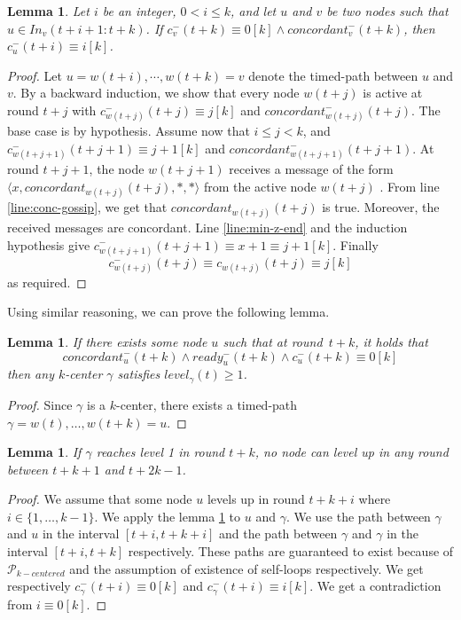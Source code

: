 \documentclass[11pt,letterpaper]{article}
\newtheorem{lem}[thm]{Lemma}
\newcommand{\cent}{\gamma}
\begin{document}
\begin{lem} \label{lem:conc-safety}
Let $i$ be an integer, $0 < i \leq k$, and let  $u$ and $v$ be two nodes such that  $u\in In_v( t+i +1 : t+k)$.
If $c^{-}_v(t+k) \equiv 0 [k] \wedge concordant^{-}_v(t+k)$, then $c_u^{-}(t+i) \equiv i [k]$.
\end{lem}
\begin{proof}
Let $u = w(t+i), \cdots, w(t+k) = v$ denote the timed-path between $u$ and $v$.
By  a backward induction,  we show  that every node $w(t+j)$  is active at round $ t + j $
	with $c_{w(t+j)}^{-}(t+j) \equiv j [k]$ and $concordant_{w(t+j)}^{-}(t+j)$.
The base case is by hypothesis.
Assume now that $i \leq j < k$, and $c_{w(t+j+1)}^{-}(t+j+1) \equiv j+1 [k]$ and $concordant_{w(t+j+1)}^{-}(t+j+1)$.
At round $t+j+1$,  the node $w(t+j+1)$ receives a message of the form $\langle x, concordant_{w(t+j)}(t+j), *, * \rangle$ %
	from the active node $w(t+j)$ .
From line \ref{line:conc-gossip}, we get that  $concordant_{w(t+j)}(t+j)$ is true. 
Moreover, the received messages are concordant. %
Line \ref{line:min-z-end} and the induction hypothesis give $c_{w(t+j+1)}^{-}(t+j+1) \equiv x+1 \equiv j+1 [k]$.
Finally  %
	$$c_{w(t+j)}^{-}(t+j) \equiv c_{w(t+j)}(t+j) \equiv j [k] $$
	as required.
\end{proof}

\noindent Using similar reasoning, we can prove the following lemma.
\begin{lem} \label{lem:conc-safety-bis}
If there exists some node $u$ such that at round~$t+k$, it holds that 
	$$concordant_u^{-}(t+k) \wedge ready_u^{-}(t+k) \wedge c_u^{-}(t+k) \equiv 0 [k] $$ 
	then any $k$-center $\gamma$ satisfies $level_\cent(t) \geq 1$.
\end{lem}
\begin{proof}
Since $\gamma$ is a $k$-center,  there exists a timed-path $\cent = w(t), \dots, w(t+k) = u$. 
\end{proof}

\begin{lem} \label{lem:no-close-level2}
	If $\cent$ reaches level 1 in round $t+k$, no node can level up in any round between $t+k+1$ and $t+2k-1$.
\end{lem}
\begin{proof}
	We assume that some node $u$ levels up in round $t+k+i$ where $i \in \{1, \dots, k-1\}$.
	We apply the lemma \ref{lem:conc-safety} to $u$ and $\cent$.
	We use the path between $\cent$ and $u$ in the interval $[t+i,t+k+i]$ and the path between $\cent$ and $\cent$ in the interval $[t+i,t+k]$ respectively.
	These paths are guaranteed to exist because of $\mathcal{P}_{k-centered}$ and the assumption of existence of self-loops respectively.
	We get respectively $c_\cent^{-}(t+i) \equiv 0 [k]$ and $c_\cent^{-}(t+i) \equiv i [k]$.
	We get a contradiction from $i \equiv 0 [k]$.
\end{proof}
\end{document}
